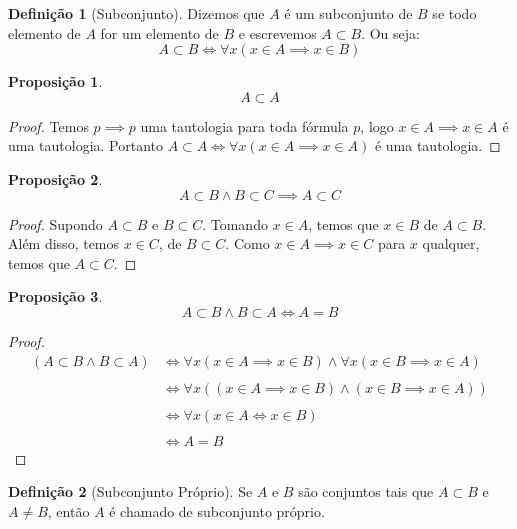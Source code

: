 \documentclass{article}
\newtheorem{prop}{Proposição}[section]
\theoremstyle{theorem}
\theoremstyle{lemma}
\theoremstyle{definition}
\newtheorem{definicao}{Definição}[section]
\theoremstyle{remark}
\begin{document}
\begin{definicao}[Subconjunto]
	Dizemos que $A$ é um subconjunto de $B$ se  todo elemento de $A$ for um elemento de $B$ e escrevemos $A\subset B$. Ou seja:
	$$ A \subset B \iff \forall x ( x\in A \implies x \in B)$$ 
\end{definicao}
\begin{prop}
	$$A\subset A$$
\end{prop}
\begin{proof}
	Temos $p \implies p$ uma tautologia para toda fórmula $p$, logo $x\in A \implies x \in A$ é uma tautologia. Portanto $A \subset A \iff \forall x ( x \in A \implies x\in A) $ é uma tautologia.
\end{proof}
\begin{prop}
	$$A\subset B \land B \subset C \implies A \subset C$$
\end{prop}
\begin{proof}
	Supondo \( A\subset B\) e \( B \subset C\). Tomando \(x\in A\), temos que \( x\in B\) de \(A\subset B\). Além disso, temos \(x\in C\), de \(B\subset C\). Como \(x\in A \implies x\in C\) para \(x\) qualquer, temos que \( A\subset C\).
\end{proof}
\begin{prop}
	$$A\subset B \land B \subset A \iff A = B$$
\end{prop}
\begin{proof}
	\begin{align*}
		(A\subset B \land B\subset A) &\iff \forall x (x\in A\implies x\in B) \land \forall x ( x\in B\implies x\in A) \\~\\
		&\iff \forall x ((x\in A\implies x\in B) \land ( x\in B \implies x\in A) )  \\~\\
		&\iff \forall x (x\in A\iff x\in B  )  \\~\\
		&\iff A = B 
	\end{align*}
\end{proof}
\begin{definicao}[Subconjunto Próprio]
	Se $A$ e $B$ são conjuntos tais que $A\subset B$ e $A \neq B$, então $A$ é chamado de subconjunto próprio.
\end{definicao}
\end{document}
